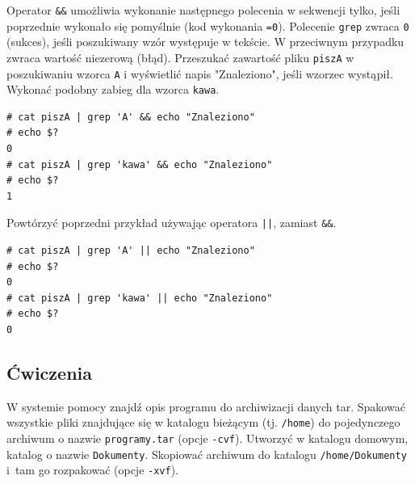 \begin{example}
Operator \lstinline[style=MyBashStyle]{&&} umożliwia wykonanie następnego polecenia w sekwencji tylko, jeśli poprzednie wykonało się pomyślnie (kod wykonania \lstinline[style=MyBashStyle]{=0}). Polecenie \lstinline[style=MyBashStyle]{grep} zwraca \lstinline[style=MyBashStyle]{0} (sukces), jeśli poszukiwany wzór występuje w tekście. W przeciwnym przypadku zwraca wartość niezerową (błąd). Przeszukać zawartość pliku \lstinline[style=MyBashStyle]{piszA} w poszukiwaniu wzorca \lstinline[style=MyBashStyle]{A} i wyświetlić napis "Znaleziono", jeśli wzorzec wystąpił. Wykonać podobny zabieg dla wzorca \lstinline[style=MyBashStyle]{kawa}.

\begin{lstlisting}[style=MyBashStyle]
# cat piszA | grep 'A' && echo "Znaleziono"
# echo $?
0
# cat piszA | grep 'kawa' && echo "Znaleziono"
# echo $?
1
\end{lstlisting}
\end{example}

\begin{example}
Powtórzyć poprzedni przykład używając operatora \lstinline[style=MyBashStyle]{||}, zamiast \lstinline[style=MyBashStyle]{&&}.
\begin{lstlisting}[style=MyBashStyle]
# cat piszA | grep 'A' || echo "Znaleziono"
# echo $?
0
# cat piszA | grep 'kawa' || echo "Znaleziono"
# echo $?
0
\end{lstlisting}
\end{example}

\subsection{Ćwiczenia}

\begin{myenumerate}
\item W systemie pomocy znajdź opis programu do archiwizacji danych tar. Spakować wszystkie pliki znajdujące się w katalogu bieżącym (tj. \lstinline[style=MyBashStyle]{/home}) do pojedynczego archiwum o nazwie \lstinline[style=MyBashStyle]{programy.tar} (opcje \lstinline[style=MyBashStyle]{-cvf}). Utworzyć w katalogu domowym, katalog o nazwie \lstinline[style=MyBashStyle]{Dokumenty}. Skopiować archiwum do katalogu \lstinline[style=MyBashStyle]{/home/Dokumenty} i~tam go rozpakować (opcje \lstinline[style=MyBashStyle]{-xvf}).
\end{myenumerate}

\cleardoublepage
